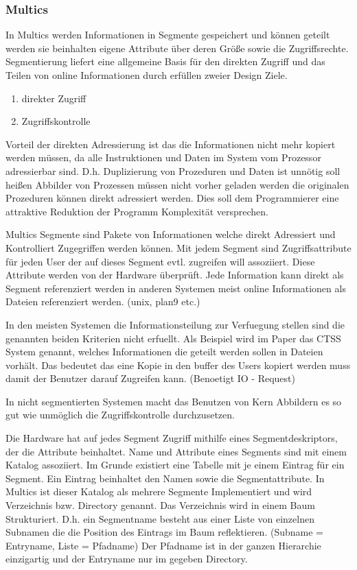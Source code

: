 \documentclass[11pt,technote]{IEEEtran}
\begin{document}
      \subsubsection{Multics}  
        In Multics werden Informationen in Segmente gespeichert und k\"onnen geteilt 
				werden sie beinhalten eigene Attribute \"uber deren Gr\"o\ss e sowie die Zugriffsrechte.
				Segmentierung liefert eine allgemeine Basis f\"ur den direkten Zugriff und das Teilen von online Informationen durch erf\"ullen zweier Design Ziele.
		    \begin{enumerate}
		      \item direkter Zugriff
		      \item Zugriffskontrolle
        \end{enumerate}
		    Vorteil der direkten Adressierung ist das die Informationen nicht mehr kopiert werden m\"ussen, da alle Instruktionen und Daten
		    im System vom Prozessor adressierbar sind. D.h. Duplizierung von Prozeduren und Daten ist unn\"otig soll hei\ss en Abbilder von Prozessen m\"ussen
		    nicht vorher geladen werden die originalen Prozeduren k\"onnen direkt adressiert werden.
		    Dies soll dem Programmierer eine attraktive Reduktion der Programm Komplexit\"at versprechen.
		  
		    Multics Segmente sind Pakete von Informationen welche direkt Adressiert und Kontrolliert Zugegriffen werden k\"onnen.
		    Mit jedem Segment sind Zugriffsattribute f\"ur jeden User der auf dieses Segment evtl. zugreifen will assoziiert.
		    Diese Attribute werden von der Hardware \"uberpr\"uft. Jede Information kann direkt als Segment referenziert werden
		    in anderen Systemen meist online Informationen als Dateien referenziert werden. (unix, plan9 etc.)
		  
		    In den meisten Systemen die Informationsteilung zur Verfuegung stellen sind die genannten beiden Kriterien nicht erfuellt.
		    Als Beispiel wird im Paper \cite{inproc:multics} das CTSS System genannt, welches Informationen die geteilt werden sollen in Dateien vorh\"alt.
		    Das bedeutet das eine Kopie in den buffer des Users kopiert werden muss damit der Benutzer darauf Zugreifen kann. (Benoetigt IO - Request)
		  
		    In nicht segmentierten Systemen macht das Benutzen von Kern Abbildern es so gut wie unm\"oglich die Zugriffskontrolle durchzusetzen.
		  
        Die Hardware hat auf jedes Segment Zugriff mithilfe eines Segmentdeskriptors, der die Attribute beinhaltet.
		    Name und Attribute eines Segments sind mit einem Katalog assoziiert. Im Grunde existiert eine Tabelle mit je einem Eintrag f\"ur ein Segment. 
		    Ein Eintrag beinhaltet den Namen sowie die Segmentattribute. In Multics ist dieser Katalog als mehrere
		    Segmente Implementiert und wird Verzeichnis bzw. Directory genannt. Das Verzeichnis wird in einem Baum Strukturiert.
		    D.h. ein Segmentname besteht aus einer Liste von einzelnen Subnamen die die Position des Eintrags im Baum reflektieren.
		    (Subname = Entryname, Liste = Pfadname)
		    Der Pfadname ist in der ganzen Hierarchie einzigartig und der Entryname nur im gegeben Directory.
		     
\end{document}
